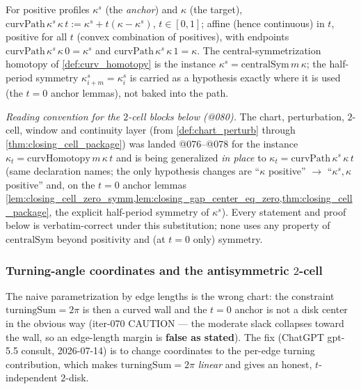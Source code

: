 \begin{definition}

  \label{def:curv_path}
  For positive profiles $\kappa^s$ (the \emph{anchor}) and $\kappa$ (the
  target), $\mathrm{curvPath}\,\kappa^s\,\kappa\,t := \kappa^s + t(\kappa -
  \kappa^s)$, $t \in [0,1]$; affine (hence continuous) in $t$, positive for all
  $t$ (convex combination of positives), with endpoints
  $\mathrm{curvPath}\,\kappa^s\,\kappa\,0 = \kappa^s$ and
  $\mathrm{curvPath}\,\kappa^s\,\kappa\,1 = \kappa$. The central-symmetrization
  homotopy of \cref{def:curv_homotopy} is the instance $\kappa^s =
  \mathrm{centralSym}\,m\,\kappa$; the half-period symmetry
  $\kappa^s_{i+m} = \kappa^s_i$ is carried as a hypothesis exactly where it is
  used (the $t=0$ anchor lemmas), not baked into the path.
\end{definition}

\emph{Reading convention for the $2$-cell blocks below (@080).} The chart,
perturbation, $2$-cell, window and continuity layer (from
\cref{def:chart_perturb} through \cref{thm:closing_cell_package}) was landed
@076--@078 for the instance $\kappa_t = \mathrm{curvHomotopy}\,m\,\kappa\,t$
and is being generalized \emph{in place} to $\kappa_t =
\mathrm{curvPath}\,\kappa^s\,\kappa\,t$ (same declaration names; the only
hypothesis changes are ``$\kappa$ positive'' $\to$ ``$\kappa^s, \kappa$
positive'' and, on the $t=0$ anchor lemmas
\cref{lem:closing_cell_zero_symm,lem:closing_gap_center_eq_zero,thm:closing_cell_package},
the explicit half-period symmetry of $\kappa^s$). Every statement and proof
below is verbatim-correct under this substitution; none uses any property of
$\mathrm{centralSym}$ beyond positivity and (at $t=0$ only) symmetry.

\subsubsection*{Turning-angle coordinates and the antisymmetric $2$-cell}

The naive parametrization by edge lengths is the wrong chart: the constraint
$\mathrm{turningSum} = 2\pi$ is then a curved wall and the $t=0$ anchor is not a
disk center in the obvious way (iter-070 CAUTION --- the moderate slack collapses
toward the wall, so an edge-length margin is \textbf{false as stated}). The fix
(ChatGPT gpt-5.5 consult, 2026-07-14) is to change coordinates to the per-edge
turning contribution, which makes $\mathrm{turningSum} = 2\pi$ \emph{linear} and
gives an honest, $t$-independent $2$-disk.

